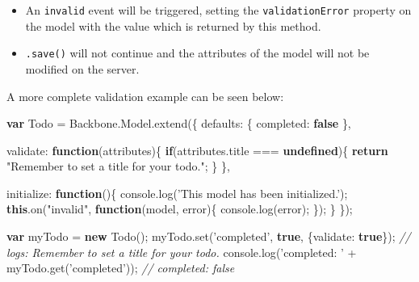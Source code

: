 \documentclass[9pt]{book}
\newenvironment{Shaded}{}{}
\newcommand{\KeywordTok}[1]{\textcolor[rgb]{0.00,0.44,0.13}{\textbf{{#1}}}}
\newcommand{\DataTypeTok}[1]{\textcolor[rgb]{0.56,0.13,0.00}{{#1}}}
\newcommand{\StringTok}[1]{\textcolor[rgb]{0.25,0.44,0.63}{{#1}}}
\newcommand{\CommentTok}[1]{\textcolor[rgb]{0.38,0.63,0.69}{\textit{{#1}}}}
\newcommand{\OtherTok}[1]{\textcolor[rgb]{0.00,0.44,0.13}{{#1}}}
\newcommand{\FunctionTok}[1]{\textcolor[rgb]{0.02,0.16,0.49}{{#1}}}
\newcommand{\NormalTok}[1]{{#1}}
\begin{document}
\begin{itemize}
\itemsep1pt\parskip0pt
\item
  An \texttt{invalid} event will be triggered, setting the
  \texttt{validationError} property on the model with the value which is
  returned by this method.
\item
  \texttt{.save()} will not continue and the attributes of the model
  will not be modified on the server.
\end{itemize}

A more complete validation example can be seen below:

\begin{Shaded}
\begin{Highlighting}[]
\KeywordTok{var} \NormalTok{Todo = }\OtherTok{Backbone}\NormalTok{.}\OtherTok{Model}\NormalTok{.}\FunctionTok{extend}\NormalTok{(\{}
  \DataTypeTok{defaults}\NormalTok{: \{}
    \DataTypeTok{completed}\NormalTok{: }\KeywordTok{false}
  \NormalTok{\},}

  \DataTypeTok{validate}\NormalTok{: }\KeywordTok{function}\NormalTok{(attributes)\{}
    \KeywordTok{if}\NormalTok{(}\OtherTok{attributes}\NormalTok{.}\FunctionTok{title} \NormalTok{=== }\KeywordTok{undefined}\NormalTok{)\{}
        \KeywordTok{return} \StringTok{"Remember to set a title for your todo."}\NormalTok{;}
    \NormalTok{\}}
  \NormalTok{\},}

  \DataTypeTok{initialize}\NormalTok{: }\KeywordTok{function}\NormalTok{()\{}
    \OtherTok{console}\NormalTok{.}\FunctionTok{log}\NormalTok{(}\StringTok{'This model has been initialized.'}\NormalTok{);}
    \KeywordTok{this}\NormalTok{.}\FunctionTok{on}\NormalTok{(}\StringTok{"invalid"}\NormalTok{, }\KeywordTok{function}\NormalTok{(model, error)\{}
        \OtherTok{console}\NormalTok{.}\FunctionTok{log}\NormalTok{(error);}
    \NormalTok{\});}
  \NormalTok{\}}
\NormalTok{\});}

\KeywordTok{var} \NormalTok{myTodo = }\KeywordTok{new} \FunctionTok{Todo}\NormalTok{();}
\OtherTok{myTodo}\NormalTok{.}\FunctionTok{set}\NormalTok{(}\StringTok{'completed'}\NormalTok{, }\KeywordTok{true}\NormalTok{, \{}\DataTypeTok{validate}\NormalTok{: }\KeywordTok{true}\NormalTok{\}); }\CommentTok{// logs: Remember to set a title for your todo.}
\OtherTok{console}\NormalTok{.}\FunctionTok{log}\NormalTok{(}\StringTok{'completed: '} \NormalTok{+ }\OtherTok{myTodo}\NormalTok{.}\FunctionTok{get}\NormalTok{(}\StringTok{'completed'}\NormalTok{)); }\CommentTok{// completed: false}
\end{Highlighting}
\end{Shaded}
\end{document}
